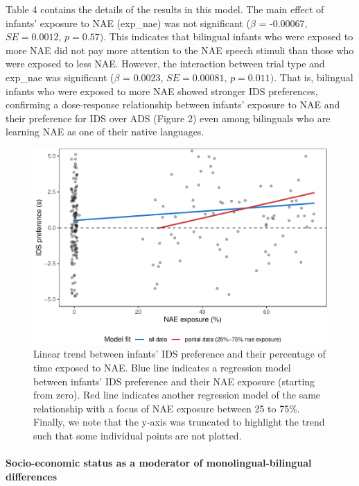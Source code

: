 \documentclass[english,,man,floatsintext]{apa6}
\begin{document}
Table 4 contains the details of the results in this model. The main effect of infants' exposure to NAE (exp\_nae) was not significant (\(\beta\) = -0.00067, \(SE = 0.0012\), \(p = 0.57)\). This indicates that bilingual infants who were exposed to more NAE did not pay more attention to the NAE speech stimuli than those who were exposed to less NAE. However, the interaction between trial type and exp\_nae was significant (\(\beta\) = 0.0023, \(SE = 0.00081\), \(p = 0.011)\). That is, bilingual infants who were exposed to more NAE showed stronger IDS preferences, confirming a dose-response relationship between infants' exposure to NAE and their preference for IDS over ADS (Figure 2) even among bilinguals who are learning NAE as one of their native languages.

\begin{figure}
\centering
\includegraphics{mb1b-paper_files/figure-latex/fig2-1.pdf}
\caption{\label{fig:fig2}Linear trend between infants' IDS preference and their percentage of time exposed to NAE. Blue line indicates a regression model between infants' IDS preference and their NAE exposure (starting from zero). Red line indicates another regression model of the same relationship with a focus of NAE exposure between 25 to 75\%. Finally, we note that the y-axis was truncated to highlight the trend such that some individual points are not plotted.}
\end{figure}

\hypertarget{socio-economic-status-as-a-moderator-of-monolingual-bilingual-differences}{%
\paragraph{Socio-economic status as a moderator of monolingual-bilingual differences}\label{socio-economic-status-as-a-moderator-of-monolingual-bilingual-differences}}
\end{document}
